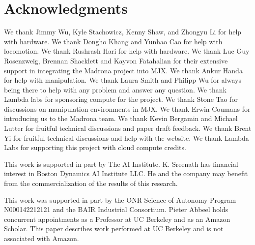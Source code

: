 \section*{Acknowledgments} 

We thank Jimmy Wu, Kyle Stachowicz, Kenny Shaw, and Zhongyu Li for help with hardware. We thank Dongho Khang and Yunhao Cao for help with locomotion. We thank Rushrash Hari for help with hardware. We thank Luc Guy Rosenzweig, Brennan Shacklett and Kayvon Fatahalian for their extensive support in integrating the Madrona project into MJX. We thank Ankur Handa for help with manipulation. We thank Laura Smith and Philipp Wu for always being there to help with any problem and answer any question. We thank Lambda labs for sponsoring compute for the project. We thank Stone Tao for discussions on manipulation environments in MJX. We thank Erwin Coumans for introducing us to the Madrona team. We thank Kevin Bergamin and Michael Lutter for fruitful technical discussions and paper draft feedback. We thank Brent Yi for fruitful technical discussions and help with the website. We thank Lambda Labs for supporting this project with cloud compute credits.

This work is supported in part by The AI Institute. K. Sreenath has financial interest in Boston Dynamics AI Institute LLC.  He and the company may benefit from the commercialization of the results of this research.

This work was supported in part by the ONR Science of Autonomy Program N000142212121 and the BAIR Industrial Consortium. Pieter Abbeel holds concurrent appointments as a Professor at UC Berkeley and as an Amazon Scholar. This paper describes work performed at UC Berkeley and is not associated with Amazon.
